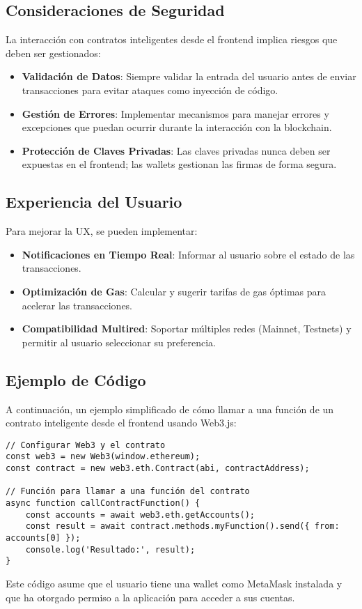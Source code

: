 \subsection{Consideraciones de Seguridad}

La interacción con contratos inteligentes desde el frontend implica riesgos que deben ser gestionados:

\begin{itemize}
    \item \textbf{Validación de Datos}: Siempre validar la entrada del usuario antes de enviar transacciones para evitar ataques como inyección de código.
    \item \textbf{Gestión de Errores}: Implementar mecanismos para manejar errores y excepciones que puedan ocurrir durante la interacción con la blockchain.
    \item \textbf{Protección de Claves Privadas}: Las claves privadas nunca deben ser expuestas en el frontend; las wallets gestionan las firmas de forma segura.
\end{itemize}

\subsection{Experiencia del Usuario}

Para mejorar la UX, se pueden implementar:

\begin{itemize}
    \item \textbf{Notificaciones en Tiempo Real}: Informar al usuario sobre el estado de las transacciones.
    \item \textbf{Optimización de Gas}: Calcular y sugerir tarifas de gas óptimas para acelerar las transacciones.
    \item \textbf{Compatibilidad Multired}: Soportar múltiples redes (Mainnet, Testnets) y permitir al usuario seleccionar su preferencia.
\end{itemize}

\subsection{Ejemplo de Código}

A continuación, un ejemplo simplificado de cómo llamar a una función de un contrato inteligente desde el frontend usando Web3.js:

\begin{verbatim}
// Configurar Web3 y el contrato
const web3 = new Web3(window.ethereum);
const contract = new web3.eth.Contract(abi, contractAddress);

// Función para llamar a una función del contrato
async function callContractFunction() {
    const accounts = await web3.eth.getAccounts();
    const result = await contract.methods.myFunction().send({ from: accounts[0] });
    console.log('Resultado:', result);
}
\end{verbatim}

Este código asume que el usuario tiene una wallet como MetaMask instalada y que ha otorgado permiso a la aplicación para acceder a sus cuentas.

